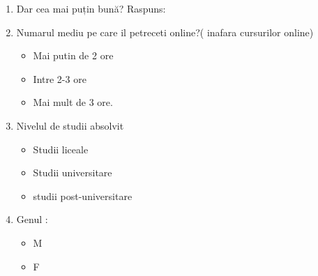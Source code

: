 \documentclass[a4paper, 12pt]{article}
\begin{document}
\begin{enumerate}
	\item Dar cea mai puțin bună?
	\newline Raspuns:
	\item	Numarul mediu pe care il petreceti online?( inafara cursurilor online) 
\thispagestyle{empty}
	\begin{itemize}
		\item Mai putin de 2 ore
		\item Intre 2-3 ore
		\item Mai mult de 3 ore.
	\end{itemize}
	\item 	Nivelul de studii absolvit
	\begin{itemize}
		\item Studii liceale
		\item Studii universitare
		\item studii post-universitare
	\end{itemize}
	\item 	Genul :
	\begin{itemize}
		\item M
		\item F
	\end{itemize} 
\end{enumerate}

	
\end{document}
